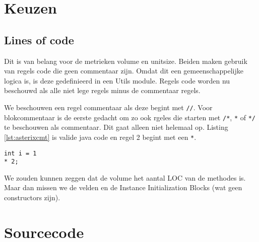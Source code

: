 \documentclass[a4paper]{article}
\begin{document}
\section{Keuzen}
\subsection{Lines of code}
Dit is van belang voor de metrieken volume en unitsize. Beiden maken gebruik van regels code die geen commentaar zijn. Omdat dit een gemeenschappelijke logica is, is deze gedefinieerd in een Utils module.
Regels code worden nu beschouwd als alle niet lege regels minus de commentaar regels.

We beschouwen een regel commentaar als deze begint met \lstinline{//}. Voor blokcommentaar is de eerste gedacht om zo ook rgeles die starten met \lstinline{/*}, \lstinline{*} of \lstinline{*/} te beschouwen als commentaar. Dit gaat alleen niet helemaal op. Listing \ref{lst:asterixcmt} is valide java code en regel 2 begint met een \lstinline{*}.

\begin{lstlisting}[caption={* als commentaar beschouwen},label={lst:asterixcmt},escapechar=|, frame = single]
int i = 1
* 2;
\end{lstlisting}

We zouden kunnen zeggen dat de volume het aantal LOC van de methodes is. Maar dan missen we de velden en de Instance Initialization Blocks (wat geen constructors zijn).



\section{Sourcecode}
\end{document}

